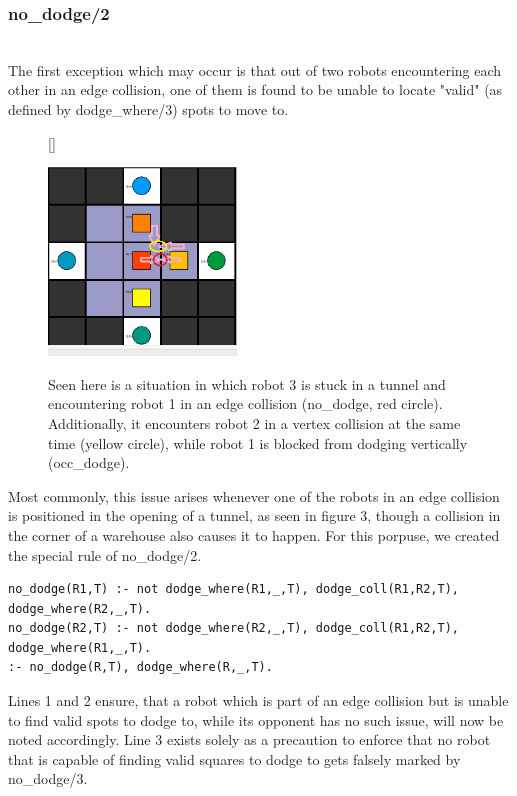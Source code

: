 \documentclass{llncs}
\begin{document}
\subsubsection{no\_dodge/2}\hfill\\
The first exception which may occur is that out of two robots encountering each other in an edge collision, one of them is found to be unable to locate "valid" (as defined by dodge\_where/3) spots to move to.\newline
\begin{figure}
[\FBwidth]
{\caption{Seen here is a situation in which robot 3 is stuck in a tunnel and encountering robot 1 in an edge collision (no\_dodge, red circle). Additionally, it encounters robot 2 in a vertex collision at the same time (yellow circle), while robot 1 is blocked from dodging vertically (occ\_dodge).}\label{fig:test}}
{\includegraphics[width=\textwidth, height= 5cm, keepaspectratio]{nododge}}
\end{figure}\newline
Most commonly, this issue arises whenever one of the robots in an edge collision is positioned in the opening of a tunnel, as seen in figure 3, though a collision in the corner of a warehouse also causes it to happen.
For this porpuse, we created the special rule of no\_dodge/2.
\begin{lstlisting}[basicstyle=\fontsize{9}{11}\selectfont\ttfamily,frame=single,breaklines=true]
no_dodge(R1,T) :- not dodge_where(R1,_,T), dodge_coll(R1,R2,T), dodge_where(R2,_,T).
no_dodge(R2,T) :- not dodge_where(R2,_,T), dodge_coll(R1,R2,T), dodge_where(R1,_,T).
:- no_dodge(R,T), dodge_where(R,_,T).
\end{lstlisting}
Lines 1 and 2 ensure, that a robot which is part of an edge collision but is unable to find valid spots to dodge to, while its opponent has no such issue, will now be noted accordingly. Line 3 exists solely as a precaution to enforce that no robot that is capable of finding valid squares to dodge to gets falsely marked by no\_dodge/3.\newline
\end{document}
